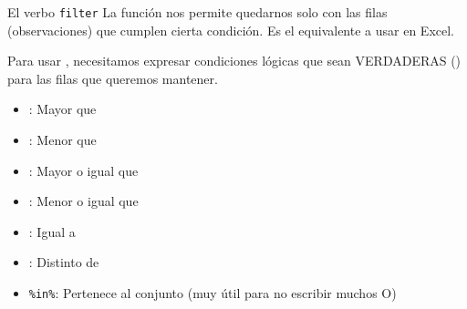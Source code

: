 \documentclass[8pt]{beamer}
\begin{document}
	
	
	
	
\begin{frame}[fragile]{El verbo \texttt{filter}}
La función  nos permite quedarnos solo con las filas (observaciones) que cumplen cierta condición. Es el equivalente a usar  en Excel.

Para usar , necesitamos expresar condiciones lógicas que sean VERDADERAS () para las filas que queremos mantener.

\begin{itemize}
	\item \rscript{>}: Mayor que
	\item \rscript{<}: Menor que
	\item \rscript{>=}: Mayor o igual que
	\item \rscript{<=}: Menor o igual que
	\item \rscript{==}: Igual a 
	\item \rscript{!=}: Distinto de
	\item \lstinline[style=RScript, basicstyle=\normalsize\ttfamily]|%in%|: Pertenece al conjunto (muy útil para no escribir muchos O)	
\end{itemize}
\end{frame}
	
	
\end{document}
